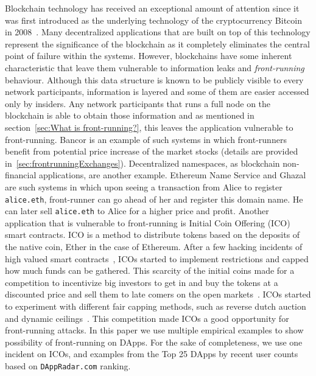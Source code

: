 Blockchain technology has received an exceptional amount of attention since it was first introduced as the underlying technology of the cryptocurrency Bitcoin in 2008~\cite{nakamoto2008bitcoin}. Many decentralized applications that are built on top of this technology represent the significance of the blockchain as it completely eliminates the central point of failure within the systems. However, blockchains have some inherent characteristic that leave them vulnerable to information leaks and \emph{front-running} behaviour. Although this data structure is known to be publicly visible to every network participants, information is layered and some of them are easier accessed only by insiders. Any network participants that runs a full node on the blockchain is able to obtain those information and as mentioned in section~\ref{sec:What is front-running?}, this leaves the application vulnerable to front-running. %
Bancor \cite{hertzog2017bancor} is an example of such systems in which front-runners benefit from potential price increase of the market stocks (details are provided in~\ref{sec:frontrunningExchanges}). Decentralized namespaces, as blockchain non-financial applications, are another example. Ethereum Name Service and Ghazal \cite{moosavighazal} are such systems in which upon seeing a transaction from Alice to register \texttt{alice.eth}, front-runner can go ahead of her and register this domain name. He can later sell \texttt{alice.eth} to Alice for a higher price and profit.
Another application that is vulnerable to front-running is Initial Coin Offering (ICO) smart contracts. ICO is a method to distribute tokens based on the deposits of the native coin, Ether in the case of Ethereum. After a few hacking incidents of high valued smart contracts~\cite{siegel2016daohack}, ICOs started to implement restrictions and capped how much funds can be gathered. This scarcity of the initial coins made for a competition to incentivize big investors to get in and buy the tokens at a discounted price and sell them to late comers on the open markets~\cite{zetzsche2018ico, li2018initial}. ICOs started to experiment with different fair capping methods, such as reverse dutch auction and dynamic ceilings~\cite{kaal2017initial}.  This competition made ICOs a good opportunity for front-running attacks.  In this paper we use multiple empirical examples to show possibility of front-running on DApps. For the sake of completeness, we use one incident on ICOs, and examples from the Top 25 DApps by recent user counts based on \texttt{DAppRadar.com} ranking. 

